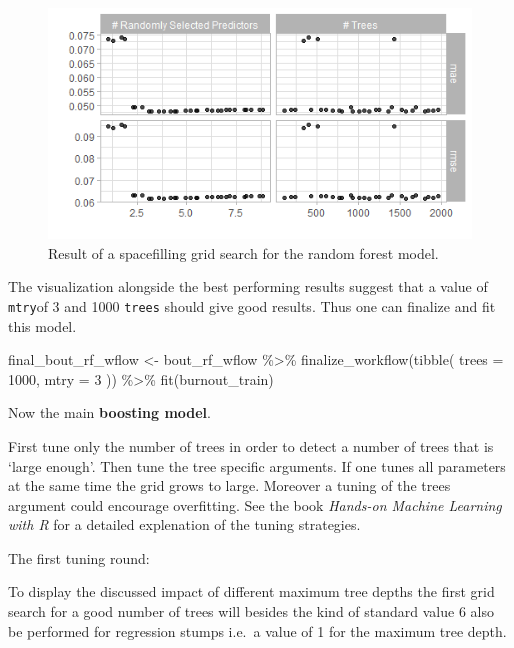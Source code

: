 \documentclass[
]{book}
\newenvironment{Shaded}{\begin{snugshade}}{\end{snugshade}}
\newcommand{\AttributeTok}[1]{\textcolor[rgb]{0.77,0.63,0.00}{#1}}
\newcommand{\DecValTok}[1]{\textcolor[rgb]{0.00,0.00,0.81}{#1}}
\newcommand{\FunctionTok}[1]{\textcolor[rgb]{0.00,0.00,0.00}{#1}}
\newcommand{\NormalTok}[1]{#1}
\newcommand{\OtherTok}[1]{\textcolor[rgb]{0.56,0.35,0.01}{#1}}
\newcommand{\SpecialCharTok}[1]{\textcolor[rgb]{0.00,0.00,0.00}{#1}}
\begin{document}
\begin{figure}

{\centering \includegraphics[width=0.7\linewidth]{_pictures/rf_burn_tune_plot} 

}

\caption{Result of a spacefilling grid search for the random forest model.}\label{fig:rfburntuneplot}
\end{figure}

The visualization alongside the best performing results suggest that a value of \texttt{mtry}of 3 and 1000 \texttt{trees} should give good results. Thus one can finalize and fit this model.

\begin{Shaded}
\begin{Highlighting}[]
\NormalTok{final\_bout\_rf\_wflow }\OtherTok{\textless{}{-}} 
\NormalTok{  bout\_rf\_wflow }\SpecialCharTok{\%\textgreater{}\%} 
  \FunctionTok{finalize\_workflow}\NormalTok{(}\FunctionTok{tibble}\NormalTok{(}
    \AttributeTok{trees =} \DecValTok{1000}\NormalTok{,}
    \AttributeTok{mtry =} \DecValTok{3}
\NormalTok{  )) }\SpecialCharTok{\%\textgreater{}\%}
  \FunctionTok{fit}\NormalTok{(burnout\_train)}
\end{Highlighting}
\end{Shaded}

Now the main \textbf{boosting model}.

First tune only the number of trees in order to detect a number of
trees that is `large enough'. Then tune the tree specific arguments.
If one tunes all parameters at the same time the grid grows to large. Moreover a tuning of the trees argument could encourage overfitting. See the book \emph{Hands-on Machine Learning with R} for a detailed explenation of the tuning strategies.\citep{HandsOnMLwithR}

The first tuning round:

To display the discussed impact of different maximum tree depths the first grid search for a good number of trees will besides the kind of standard value 6 also be performed for regression stumps i.e.~a value of 1 for the maximum tree depth.
\end{document}
